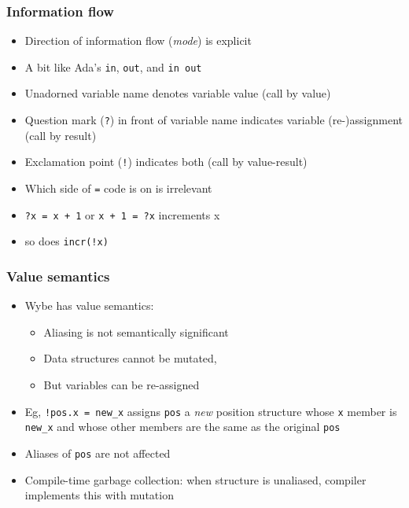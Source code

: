 \documentclass[12pt]{beamer}
\begin{document}
\begin{frame}[fragile]
\frametitle{Information flow}
\begin{itemize}
\item Direction of information flow (\emph{mode}) is explicit
\item A bit like Ada's \texttt{in}, \texttt{out}, and \texttt{in out}
\item Unadorned variable name denotes variable value (call by value)
\item Question mark (\texttt{?}) in front of variable name indicates
  variable (re-)assignment (call by result)
\item Exclamation point (\texttt{!}) indicates both (call by value-result)
\item Which side of \texttt{=} code is on is irrelevant
\item \texttt{?x = x + 1} or \texttt{x + 1 = ?x} increments x
\item so does \texttt{incr(!x)}
\end{itemize}
\end{frame}


\begin{frame}[fragile]
\frametitle{Value semantics}
\begin{itemize}
\item Wybe has value semantics:
  \begin{itemize}
  \item Aliasing is not semantically significant
  \item Data structures cannot be mutated,
  \item But variables can be re-assigned
  \end{itemize}
\item Eg, \texttt{!pos.x = new\_x} assigns \texttt{pos}
  a \emph{new} position structure whose \texttt{x} member is
  \texttt{new\_x} and
  whose other members are the same as the original \texttt{pos}
\item Aliases of \texttt{pos} are not affected
\item Compile-time garbage collection:  when structure is unaliased,
  compiler implements this with mutation
\end{itemize}
\end{frame}
\end{document}
